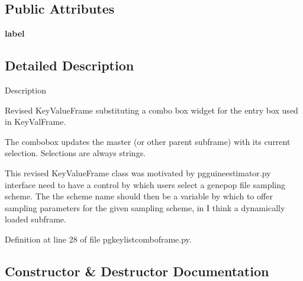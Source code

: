 \subsection*{Public Attributes}
\begin{DoxyCompactItemize}
\item 
{\bfseries label}\hypertarget{classnegui_1_1pgkeylistcomboframe_1_1KeyListComboFrame_a65085e88d0b71a00495a2e14299b3f65}{}\label{classnegui_1_1pgkeylistcomboframe_1_1KeyListComboFrame_a65085e88d0b71a00495a2e14299b3f65}

\end{DoxyCompactItemize}


\subsection{Detailed Description}
\begin{DoxyVerb}Description

Revised KeyValueFrame
substituting a combo box widget
for the entry box used in KeyValFrame.

The combobox updates the master
(or other parent subframe) with its
current selection.  Selections are always
strings.

This revised KeyValueFrame class was 
motivated by pgguineestimator.py interface
need to have a control by which users
select a genepop file sampling 
scheme. The the scheme name should then be a 
variable by which to offer sampling parameters
for the given sampling scheme, in I think 
a dynamically loaded subframe.
\end{DoxyVerb}
 

Definition at line 28 of file pgkeylistcomboframe.\+py.



\subsection{Constructor \& Destructor Documentation}
